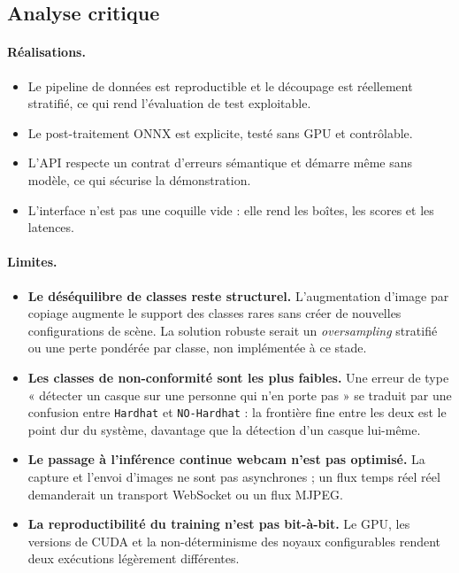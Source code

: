 \documentclass[11pt,a4paper]{article}
\begin{document}
\subsection{Analyse critique}

\paragraph{Réalisations.}
\begin{itemize}[leftmargin=1.2em]
  \item Le pipeline de données est reproductible et le découpage est
        réellement stratifié, ce qui rend l'évaluation de test exploitable.
  \item Le post-traitement ONNX est explicite, testé sans GPU et contrôlable.
  \item L'API respecte un contrat d'erreurs sémantique et démarre même sans
        modèle, ce qui sécurise la démonstration.
  \item L'interface n'est pas une coquille vide : elle rend les boîtes, les
        scores et les latences.
\end{itemize}

\paragraph{Limites.}
\begin{itemize}[leftmargin=1.2em]
  \item \textbf{Le déséquilibre de classes reste structurel.} L'augmentation
        d'image par copiage augmente le support des classes rares sans
        créer de nouvelles configurations de scène. La solution robuste
        serait un \emph{oversampling} stratifié ou une perte pondérée par
        classe, non implémentée à ce stade.
  \item \textbf{Les classes de non-conformité sont les plus faibles.} Une
        erreur de type « détecter un casque sur une personne qui n'en porte
        pas » se traduit par une confusion entre \texttt{Hardhat} et
        \texttt{NO-Hardhat} : la frontière fine entre les deux est le point
        dur du système, davantage que la détection d'un casque lui-même.
  \item \textbf{Le passage à l'inférence continue webcam n'est pas
        optimisé.} La capture et l'envoi d'images ne sont pas asynchrones ;
        un flux temps réel réel demanderait un transport WebSocket ou un
        flux MJPEG.
  \item \textbf{La reproductibilité du training n'est pas bit-à-bit.} Le
        GPU, les versions de CUDA et la non-déterminisme des noyaux
        configurables rendent deux exécutions légèrement différentes.
\end{itemize}
\end{document}
